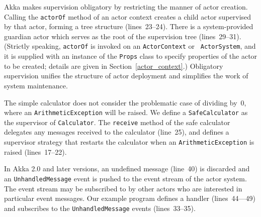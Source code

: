 Akka makes supervision obligatory by restricting the manner of actor
creation.  Calling the {\tt actorOf} method of an actor context
creates a child actor supervised by that actor, forming a tree
structure (lines~23--24).  There is a system-provided guardian actor which
serves as the root of the supervision tree (lines~29--31).  (Strictly
speaking, {\tt actorOf} is invoked on an {\tt ActorContext} or {\tt
  ActorSystem}, and it is supplied with an instance of the {\tt Props}
class to specify properties of the actor to be created; details are
given in Section~\ref{actor_context}.)  Obligatory supervision unifies
the structure of actor deployment and simplifies the work of system
maintenance.


The simple calculator does not consider the problematic case of dividing by~0,
where an {\tt ArithmeticException} will be raised.  We define 
a {\tt SafeCalculator} as the supervisor of {\tt Calculator}.
The {\tt receive} method of the safe calculator delegates any
messages received to the calculator (line~25), and defines a
supervisor strategy that restarts the calculator when an
{\tt ArithmeticException} is raised (lines~17--22).


In Akka 2.0 and later versions, an undefined message (line~40) is discarded and 
an {\tt UnhandledMessage} event is pushed to the event stream of the 
actor system. The event stream may be subscribed to by other actors who are 
interested in particular event messages. Our example program defines a
handler (lines~44---49) and subscribes to the {\tt UnhandledMessage} events
(lines~33--35).

